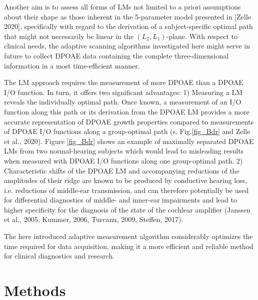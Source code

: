 \documentclass[journal,twoside,web]{ieeecolor2}
\begin{document}
Another aim is to assess all forms of LMs not limited to a priori assumptions about their shape as those inherent in the 5-parameter model presented in [Zelle 2020], specifically with regard to the derivation of a subject-specific optimal path that might not necessarily be linear in the $(L_2, L_1)$-plane. With respect to clinical needs, the adaptive scanning algorithms investigated here might serve in future to collect DPOAE data containing the complete three-dimensional information in a most time-efficient manner.

The LM approach requires the measurement of more DPOAE than a DPOAE I/O function. In turn, it offers two significant advantages: 1) Measuring a LM reveals the individually optimal path. Once known, a measurement of an I/O function along this path or its derivation from the DPOAE LM provides a more accurate representation of DPOAE growth properties compared to measurements of DPOAE I/O functions along a group-optimal path (s. Fig.\ref{fig_Bdr} and Zelle et al., 2020). Figure \ref{fig_Bdr} shows an example of maximally separated DPOAE LMs from two normal-hearing subjects which would lead to misleading results when measured with DPOAE I/O functions along one group-optimal path. 2) Characteristic shifts of the DPOAE LM and accompanying reductions of the amplitudes of their ridge are known to be produced by conductive hearing loss, i.e. reductions of middle-ear transmission, and can therefore potentially be used for differential diagnostics of middle- and inner-ear impairments and lead to higher specificity for the diagnosis of the state of the cochlear amplifier (Janssen et al., 2005, Kummer, 2006, Turcanu, 2009, Steffen, 2017).

The here introduced adaptive measurement algorithm considerably optimizes the time required for data acquisition, making it a more efficient and reliable method for clinical diagnostics and research.

\section{Methods}
\end{document}
